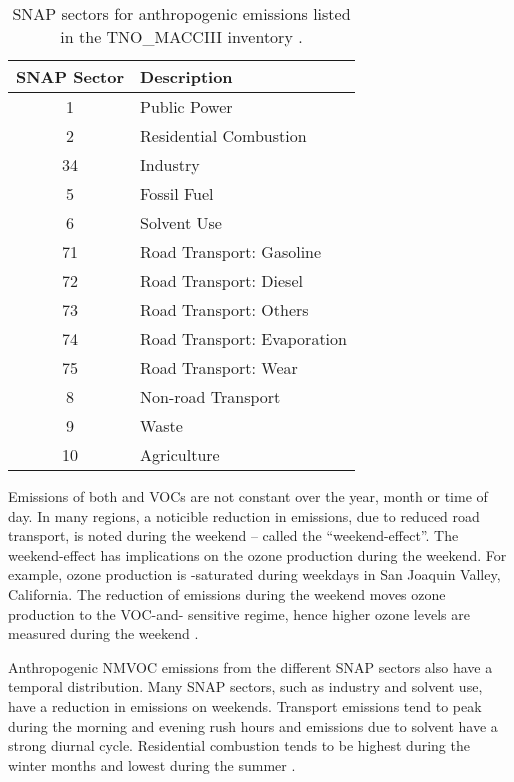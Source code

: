 \begin{table}
    \centering
    \caption[SNAP sectors in the TNO\_MACCIII]{SNAP sectors for anthropogenic emissions listed in the TNO\_MACCIII inventory \citep{Kuenen:2014}.}
    \begin{tabular}{cl}
        \hline \hline
        \textbf{SNAP Sector} & \textbf{Description} \\
        \hline \hline
        1 & Public Power \\
        2 & Residential Combustion \\
        34 & Industry \\
        5 & Fossil Fuel \\
        6 & Solvent Use \\
        71 & Road Transport: Gasoline \\
        72 & Road Transport: Diesel \\
        73 & Road Transport: Others \\
        74 & Road Transport: Evaporation \\
        75 & Road Transport: Wear \\
        8 & Non-road Transport \\
        9 & Waste \\
        10 & Agriculture \\
        \hline \hline
    \end{tabular}
    \label{t:SNAP}
\end{table}

Emissions of both  and VOCs are not constant over the year, month or time of day.
In many regions, a noticible reduction in  emissions, due to reduced road transport, is noted during the weekend -- called the ``weekend-effect''.
The weekend-effect has implications on the ozone production during the weekend.
For example, ozone production is -saturated during weekdays in San Joaquin Valley, California.
The reduction of  emissions during the weekend moves ozone production to the VOC-and- sensitive regime, hence higher ozone levels are measured during the weekend \citep{Pusede:2014}.

Anthropogenic NMVOC emissions from the different SNAP sectors also have a temporal distribution.
Many SNAP sectors, such as industry and solvent use, have a reduction in emissions on weekends.
Transport emissions tend to peak during the morning and evening rush hours and emissions due to solvent have a strong diurnal cycle.
Residential combustion tends to be highest during the winter months and lowest during the summer \citep{Gon:2011}.

